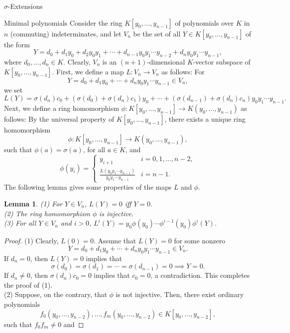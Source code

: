 \documentclass[11pt,a4paper]{article}
\theoremstyle{theorem}
\newtheorem{lemma}[theorem]{Lemma}
\numberwithin{equation}{section}
\newcommand{\s}{\sigma}
\begin{document}
\begin{section}{$\s$-Extensions}
\begin{subsection}{Minimal polynomials}
	Consider the ring $K[y_0,...,y_{n-1}]$  of polynomials over $K$ in $n$ (commuting) indeterminates, and  let $V_n$ be the set of all $Y\in K[y_0,...,y_{n-1}]$ of the form
	$$Y=d_0+d_{1}y_0+d_{2}y_0y_1+\cdots+d_{n-1}y_{0}y_{1}\cdots y_{n-2}+d_{n}y_{0}y_{1}\cdots y_{n-1},$$
	where $d_0,...,d_{n}\in K$. Clearly, $V_n$ is an $(n+1)$-dimensional $K$-vector subspace of  $K[y_0,...,y_{n-1}]$. First, we define a map $L:V_n\to V_n$ as follows: For
	$$Y=d_0+d_{1}y_0+\cdots+d_{n}y_{0}y_{1}\cdots y_{n-1}\in V_n,$$
	we set
	$$L(Y)=
	\sigma (d_{n}) c_0+(\sigma (d_{0})+\sigma (d_{n})c_{1})y_0+\cdots+(\sigma (d_{n-1})+\sigma (d_{n})c_{n})y_0y_{1}\cdots y_{n-1}.
	$$	
	Next, we define a ring homomorphism $\phi:K[y_0,...,y_{n-1}]\to K(y_0,...,y_{n-1})$ as follows:
	By the universal property of $K[y_0,...,y_{n-1}]$, there exists a unique ring homomorphism
	$$\phi:K[y_0,...,y_{n-1}]\to K(y_0,...,y_{n-1}),$$
	such that $\phi(a)=\s(a)$, for all $a\in K$, and $$\phi(y_i)=\begin{cases}
		y_{i+1} & i=0,1,...,n-2,\\
		\frac{L(y_0y_1\cdots y_{n-1})}{y_0y_1\cdots y_{n-1}} & i=n-1.
	\end{cases}
	$$
	The following lemma gives some  properties of the maps $L$ and $\phi$. 
	\begin{lemma}\label{(L)ZerosofL}
		(1) For  $Y\in V_n$, $L(Y)=0$ iff $Y=0$. \\
		(2) The ring homomorphism $\phi$ is injective.\\
		(3) For all $Y\in V_n$ and $i>0$, $L^i(Y)=y_0\phi(y_0)\cdots \phi^{i-1}(y_{0})\phi^i(Y)$. 
	\end{lemma}
	\begin{proof}
		(1) Clearly, $L(0)=0$. Assume that $L(Y)=0$ for some nonzero
		$$Y=d_0+d_{1}y_0+\cdots+d_{n}y_{0}y_{1}\cdots y_{n-1}\in V_n.$$
		If $d_n=0$, then $L(Y)=0$ implies that 
		$$\sigma(d_0)=\sigma(d_1)=\cdots=\sigma(d_{n-1})=0\implies Y=0.$$
		If $d_n\neq 0$,  then $\s(d_n)c_0=0$ implies that  $c_0=0$, a contradiction. This completes the proof of (1). \\
		(2) Suppose, on the contrary, that $\phi$ is not injective. Then, there exist ordinary polynomials 
		$$f_0(y_0,...,y_{n-2}),\dots, f_m(y_0,...,y_{n-2})\in K[y_0,...,y_{n-2}],$$
		such that $f_0f_m\neq 0$ and 

\end{proof}
\end{subsection}
\end{section}
\end{document}

